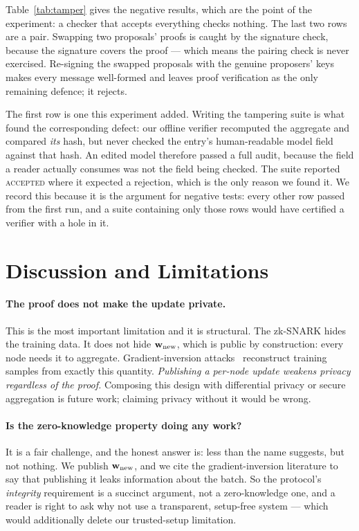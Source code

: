 \documentclass{llncs}
\begin{document}
Table~\ref{tab:tamper} gives the negative results, which are the point of the
experiment: a checker that accepts everything checks nothing. The last two rows
are a pair. Swapping two proposals' proofs is caught by the signature check,
because the signature covers the proof --- which means the pairing check is never
exercised. Re-signing the swapped proposals with the genuine proposers' keys
makes every message well-formed and leaves proof verification as the only
remaining defence; it rejects.

The first row is one this experiment added. Writing the tampering suite is what
found the corresponding defect: our offline verifier recomputed the aggregate
and compared \emph{its} hash, but never checked the entry's human-readable model
field against that hash. An edited model therefore passed a full audit, because
the field a reader actually consumes was not the field being checked. The suite
reported \textsc{accepted} where it expected a rejection, which is the only
reason we found it. We record this because it is the argument for negative
tests: every other row passed from the first run, and a suite containing only
those rows would have certified a verifier with a hole in it.

\section{Discussion and Limitations}
\label{sec:limitations}

\paragraph{The proof does not make the update private.}
This is the most important limitation and it is structural. The zk-SNARK hides
the training data. It does not hide $\mathbf{w}_{\rm new}$, which is public by
construction: every node needs it to aggregate. Gradient-inversion
attacks~\cite{zhu2019deepleakage,geiping2020inverting} reconstruct training
samples from exactly this quantity. \emph{Publishing a per-node update weakens
privacy regardless of the proof.} Composing this design with differential
privacy or secure aggregation is future work; claiming privacy without it would
be wrong.

\paragraph{Is the zero-knowledge property doing any work?}
It is a fair challenge, and the honest answer is: less than the name suggests,
but not nothing. We publish $\mathbf{w}_{\rm new}$, and we cite the
gradient-inversion literature to say that publishing it leaks information about
the batch. So the protocol's \emph{integrity} requirement is a succinct
argument, not a zero-knowledge one, and a reader is right to ask why not use a
transparent, setup-free system --- which would additionally delete our
trusted-setup limitation.
\end{document}
